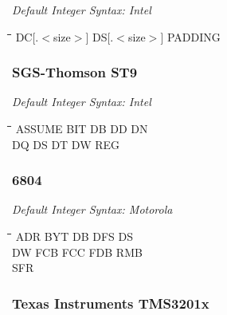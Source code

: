 {\em Default Integer Syntax: Intel}

{\tt\begin{tabbing}
\hspace{3cm}\=\hspace{3cm}\=\hspace{3cm}\=\hspace{3cm}\=\kill
DC[.$<$size$>$] \> DS[.$<$size$>$]   \> PADDING \\
\end{tabbing}}

\subsubsection{SGS-Thomson ST9}

{\em Default Integer Syntax: Intel}

{\tt\begin{tabbing}
\hspace{3cm}\=\hspace{3cm}\=\hspace{3cm}\=\hspace{3cm}\=\kill
ASSUME     \> BIT         \> DB          \> DD          \> DN \\
DQ         \> DS          \> DT          \> DW          \> REG \\
\end{tabbing}}

\subsubsection{6804}

{\em Default Integer Syntax: Motorola}

{\tt\begin{tabbing}
\hspace{3cm}\=\hspace{3cm}\=\hspace{3cm}\=\hspace{3cm}\=\kill
ADR        \> BYT         \> DB          \> DFS         \> DS \\
DW         \> FCB         \> FCC         \> FDB         \> RMB \\
SFR \\
\end{tabbing}}

\subsubsection{Texas Instruments TMS3201x}


